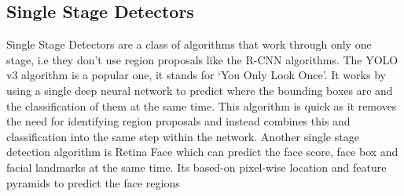 \documentclass{article}
\begin{document}
\subsection{Single Stage Detectors}
Single Stage Detectors are a class of algorithms that work through only one stage, i.e they
don’t use region proposals like the R-CNN algorithms. The YOLO v3 \cite{Redmon2016}
algorithm is a popular one, it stands for ‘You Only Look Once’. It works by using a single deep
neural network to predict where the bounding boxes are and the classification of them at the
same time. This algorithm is quick as it removes the need for identifying region proposals and
instead combines this and classification into the same step within the network.
Another single stage detection algorithm is Retina Face \cite{Deng2019} which can predict
the face score, face box and facial landmarks at the same time. Its based-on pixel-wise location
and feature pyramids to predict the face regions
\end{document}

